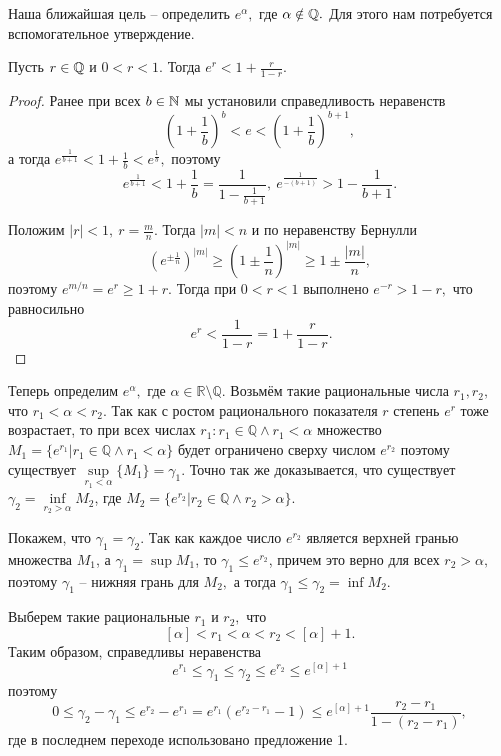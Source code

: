 Наша ближайшая цель -- определить $e^\alpha,$
где $\alpha\notin\mathbb{Q}.$ Для этого нам потребуется
вспомогательное утверждение.
\begin{proposition}
    Пусть $r\in\mathbb{Q}$ и $0 < r < 1.$ Тогда
    $e^r <1+\frac{r}{1-r}.$
\end{proposition}
\begin{proof}
    Ранее при всех $b\in \mathbb{N}$ мы установили справедливость неравенств
    $$
        \left(1+\frac{1}{b}\right)^b<e<
        \left(1+\frac{1}{b}\right)^{b+1},
    $$
    а тогда
    $
        e^{\frac{1}{b+1}} < 1 + \frac{1}{b} < e^{\frac{1}{b}},
    $
    поэтому
    $$
        e^{\frac{1}{b+1}} < 1 + \frac{1}{b} = \frac{1}
        {1 - \frac{1}{b+1}}, \ e^{\frac{1}{-(b+1)}} >
        1 - \frac{1}{b+1}.
    $$

    Положим $|r|<1, \ r = \frac{m}{n}.$
    Тогда $|m|<n$ и по неравенству Бернулли
    $$
        (e^{\pm \frac{1}{n}})^{|m|} \geq
        \left(1 \pm \frac{1}{n}\right)^{|m|} \geq
        1 \pm \frac{|m|}{n},
    $$
    поэтому $e^{m/n} = e^r \geq 1+r.$
    Тогда при
    $0 < r < 1$ выполнено $e^{-r}>1-r,$ что
    равносильно
    $$
        \ e^r <
        \frac{1}{1-r} = 1+\frac{r}{1-r}.
    $$
\end{proof}

Теперь определим $e^\alpha,$ где $\alpha \in
    \mathbb R\setminus \mathbb Q$. Возьмём такие рациональные
числа $r_1, r_2,$ что $r_1 < \alpha < r_2.$
Так как с ростом рационального показателя $r$
степень $e^r$ тоже возрастает, то при всех
числах $r_1 : r_1 \in \mathbb Q \wedge r_1
    < \alpha$ множество $M_1 = \{e^{r_1}| r_1
    \in  \mathbb Q
    \wedge r_1 < \alpha\}$
будет ограничено сверху числом $e^{r_2}$
поэтому существует
$\sup\limits_{r_1<\alpha} \{M_1\} = \gamma_1.$
Точно так же доказывается, что существует
$\gamma_2 = \inf\limits_{r_2>\alpha} M_2$,
где $M_2 = \{e^{r_2}| r_2 \in  \mathbb Q
    \wedge r_2 > \alpha\}$.

Покажем, что $\gamma_1 = \gamma_2$.
Так как каждое число $e^{r_2}$ является верхней
гранью множества $M_1$, а $\gamma_1 = \sup M_1$,
то $\gamma_1 \leq e^{r_2}$, причем это
верно для всех $r_2>\alpha,$ поэтому
$\gamma_1$ -- нижняя грань для $M_2,$
а тогда $\gamma_1 \leq \gamma_2 = \inf M_2$.

Выберем такие рациональные $r_1$ и $r_2,$ что
$$
    [\alpha] < r_1 < \alpha < r_2 < [\alpha] + 1.
$$
Таким образом, справедливы неравенства
$$
    e^{r_1} \leq \gamma_1 \leq \gamma_2
    \leq e^{r_2} \leq e^{[\alpha] + 1}
$$
поэтому
$$
    0 \leq \gamma_2 - \gamma_1 \leq e^{r_2} - e^{r_1} =
    e^{r_1}(e^{r_2 - r_1} - 1) \leq e^{[\alpha] +1}
    \frac{r_2 - r_1}{1 - (r_2 - r_1)},
$$
где в последнем переходе использовано
предложение 1.

